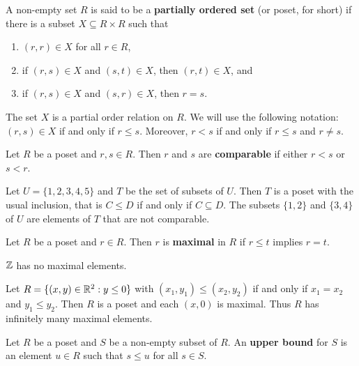 
\begin{definition}
A non-empty set $R$ is said to be a \textbf{partially ordered set} (or poset, for short) 
if there is a subset $X\subseteq R\times R$ such that
\begin{enumerate}
    \item $(r,r)\in X$ for all $r\in R$, 
    \item if $(r,s)\in X$ and $(s,t)\in X$, then $(r,t)\in X$, and 
    \item if $(r,s)\in X$ and $(s,r)\in X$, then $r=s$. 
\end{enumerate}
\end{definition}

The set $X$ is a partial order relation on $R$.  
We will use the following notation: $(r,s)\in X$ if and only if $r\leq s$. Moreover, 
$r<s$ if and only if $r\leq s$ and $r\ne s$. 

\begin{definition}
Let $R$ be a poset and $r,s\in R$. Then $r$ and $s$ are \textbf{comparable}
if either $r<s$ or $s<r$.
\end{definition}

\begin{example}
Let $U=\{1,2,3,4,5\}$ and $T$ be the set of subsets of $U$. Then $T$ is a poset
with the usual inclusion, that is $C\leq D$ if and only if $C\subseteq D$. The subsets
$\{1,2\}$ and $\{3,4\}$ of $U$ are elements of $T$ that are not comparable. 
\end{example}

\begin{definition}
    Let $R$ be a poset and $r\in R$. Then $r$ is \textbf{maximal} in $R$ if 
    $r\leq t$ implies $r=t$. 
\end{definition}

\begin{example}
$\mathbb{Z}$ has no maximal elements. 
\end{example}

\begin{example}
Let $R=\{(x,y)\in\mathbb{R}^2:y\leq0\}$ with $(x_1,y_1)\leq(x_2,y_2)$ if and only if $x_1=x_2$ and $y_1\leq y_2$. Then
$R$ is a poset and each $(x,0)$ is maximal. Thus $R$ has infinitely many maximal elements.
\end{example}

\begin{definition}
    Let $R$ be a poset and $S$ be a non-empty subset of $R$. An \textbf{upper bound}
    for $S$ is an element $u\in R$ such that $s\leq u$ for all $s\in S$. 
\end{definition}

